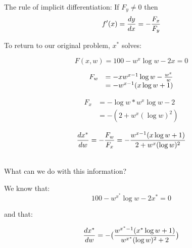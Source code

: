 \documentclass[10pt]{seminar}
\begin{document}
\begin{slide}
\ \\The rule of implicit differentiation: If $F_y\not=0$ then $$f^\prime(x) = {{dy}\over{dx}}=-{{F_x}\over{F_y}}$$







\newslide

To return to our original problem, $x^*$ solves:

$$F(x, w)=100-w^x \log{w}-2 x=0$$

\[\begin{array}{ll}F_w&=-xw^{x-1}\log{w}-{{w^x}\over w}\\
&=-w^{x-1}(x\log{w}+1)
\end{array}\]

\[\begin{array}{ll}F_x&= -\log{w}*w^x\log{w}-2\\
&=-(2+w^x(\log{w})^2)
\end{array}\]

$${{dx^*}\over{dw}}=-{{F_w}\over{F_{x}}}= -\frac{w^{x-1} (x \log{w}+1)}{2+w^x (\log{w})^2}$$

\ \\What can we do with this information? %
\newslide

We know that:
$$100-w^{x^*} \log{w}-2 x^*=0$$

and that:

$${{dx^*}\over{dw}}= -\big({\frac{w^{x^*-1} (x^* \log{w}+1)}{w^{x^*} (\log{w})^2+2}}\big)$$


\end{slide}
\end{document}
